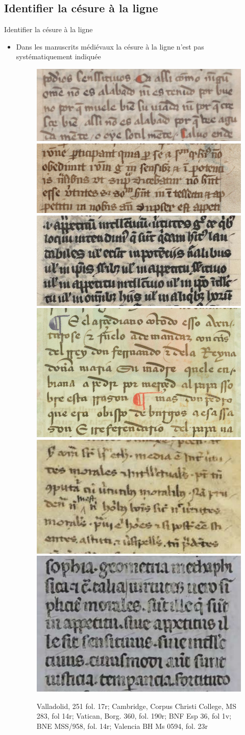 \documentclass[11pt,aspectratio=169]{beamer}
\begin{document}
\subsection{Identifier la césure à la ligne}
\begin{frame}{Identifier la césure à la ligne}
\begin{center}
\begin{itemize}
\item Dans les manuscrits médiévaux la césure à la ligne n'est pas systématiquement indiquée
\begin{figure}
\includegraphics[width=.32\textwidth]{img/Valladolid_251_17r.png}
\includegraphics[width=.32\textwidth]{img/CCC_MSS_283_14r.png}
\includegraphics[width=.27\textwidth]{img/Borgh_360_190r.png}
\includegraphics[width=.27\textwidth]{img/BNF_esp_36_1v.png}
\includegraphics[width=.27\textwidth]{img/BNE_958_14r.png}
\includegraphics[width=.27\textwidth]{img/Valencia_BH-Ms-0594_23r.png}
\caption{Valladolid, 251 fol. 17r; Cambridge, Corpus Christi College, MS 283, fol 14r; Vatican, Borg. 360, fol. 190r;  BNF Esp 36, fol 1v;  BNE MSS/958, fol. 14r; Valencia BH Ms 0594, fol. 23r}

\end{figure}
\end{itemize}
\end{center}
\end{frame}
\end{document}
